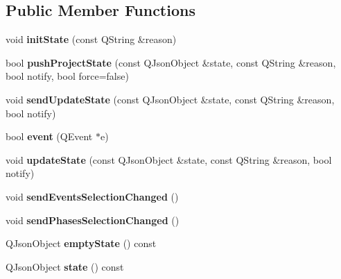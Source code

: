 \subsection*{Public Member Functions}
\begin{DoxyCompactItemize}
\item 
\hypertarget{class_project_a719178fa98331f684d7684f61708976d}{void {\bfseries init\-State} (const Q\-String \&reason)}\label{class_project_a719178fa98331f684d7684f61708976d}

\item 
\hypertarget{class_project_a1acbcb9fd1c29a2999b547ec0ebf9180}{bool {\bfseries push\-Project\-State} (const Q\-Json\-Object \&state, const Q\-String \&reason, bool notify, bool force=false)}\label{class_project_a1acbcb9fd1c29a2999b547ec0ebf9180}

\item 
\hypertarget{class_project_a3ccf280a513b0ab99d466e5377b23805}{void {\bfseries send\-Update\-State} (const Q\-Json\-Object \&state, const Q\-String \&reason, bool notify)}\label{class_project_a3ccf280a513b0ab99d466e5377b23805}

\item 
\hypertarget{class_project_a74b239f463b56dc5cd894c78c811afc6}{bool {\bfseries event} (Q\-Event $\ast$e)}\label{class_project_a74b239f463b56dc5cd894c78c811afc6}

\item 
\hypertarget{class_project_a75b7c382cab047a0b118757e6b9f2af2}{void {\bfseries update\-State} (const Q\-Json\-Object \&state, const Q\-String \&reason, bool notify)}\label{class_project_a75b7c382cab047a0b118757e6b9f2af2}

\item 
\hypertarget{class_project_a920d24bf72bb0853f0f4e149f9ad38bf}{void {\bfseries send\-Events\-Selection\-Changed} ()}\label{class_project_a920d24bf72bb0853f0f4e149f9ad38bf}

\item 
\hypertarget{class_project_a45a2a8a5caeb3d1e4e2363c41492537d}{void {\bfseries send\-Phases\-Selection\-Changed} ()}\label{class_project_a45a2a8a5caeb3d1e4e2363c41492537d}

\item 
\hypertarget{class_project_a67cf931c8b793096b9542501d391a342}{Q\-Json\-Object {\bfseries empty\-State} () const }\label{class_project_a67cf931c8b793096b9542501d391a342}

\item 
\hypertarget{class_project_a04e63d0e66bb9c8898a7a7809abdb294}{Q\-Json\-Object {\bfseries state} () const }\label{class_project_a04e63d0e66bb9c8898a7a7809abdb294}


\end{DoxyCompactItemize}
